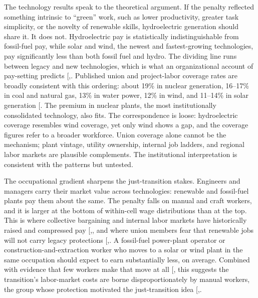 \documentclass[
  11pt,
]{article}
\begin{document}
The technology results speak to the theoretical argument. If the penalty
reflected something intrinsic to ``green'' work, such as lower
productivity, greater task simplicity, or the novelty of renewable
skills, hydroelectric generation should share it. It does not.
Hydroelectric pay is statistically indistinguishable from fossil-fuel
pay, while solar and wind, the newest and fastest-growing technologies,
pay significantly less than both fossil fuel and hydro. The dividing
line runs between legacy and new technologies, which is what an
organizational account of pay-setting predicts
{[},\citeproc{ref-winner1980artifacts}{37}{]}.
Published union and project-labor coverage rates are broadly consistent
with this ordering: about 19\% in nuclear generation, 16--17\% in coal
and natural gas, 13\% in water power, 12\% in wind, and 11--14\% in
solar generation {[}\citeproc{ref-doe2024useer}{11}{]}. The premium in
nuclear plants, the most institutionally consolidated technology, also
fits. The correspondence is loose: hydroelectric coverage resembles wind
coverage, yet only wind shows a gap, and the coverage figures refer to a
broader workforce. Union coverage alone cannot be the mechanism; plant
vintage, utility ownership, internal job ladders, and regional labor
markets are plausible complements. The institutional interpretation is
consistent with the patterns but untested.

The occupational gradient sharpens the just-transition stakes. Engineers
and managers carry their market value across technologies: renewable and
fossil-fuel plants pay them about the same. The penalty falls on manual
and craft workers, and it is larger at the bottom of within-cell wage
distributions than at the top. This is where collective bargaining and
internal labor markets have historically raised and compressed pay
{[},\citeproc{ref-western2011unions}{33}{]},
and where union members fear that renewable jobs will not carry legacy
protections
{[},\citeproc{ref-sicotte2025labor}{39}{]}.
A fossil-fuel power-plant operator or construction-and-extraction worker
who moves to a solar or wind plant in the same occupation should expect
to earn substantially less, on average. Combined with evidence that few
workers make that move at all
{[}\citeproc{ref-curtis2024workers}{21}{]}, this suggests the
transition's labor-market costs are borne disproportionately by manual
workers, the group whose protection motivated the just-transition idea
{[},\citeproc{ref-newell2013political}{13}{]}.
\end{document}
